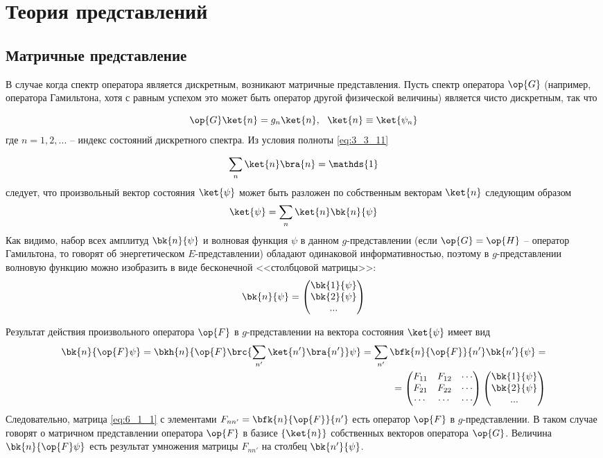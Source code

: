 \chapter{Теория представлений}

\section{Матричные представление}

В случае когда спектр оператора является дискретным, возникают матричные представления. Пусть спектр оператора $\op{G}$ (например, оператора Гамильтона, хотя с равным успехом это может быть оператор другой физической величины) является чисто дискретным, так что

$$
\op{G} \ket{n} = g_n \ket{n},~~ \ket{n} \equiv \ket{\psi_n}
$$%
%
где $n = 1, 2,...$ -- индекс состояний дискретного спектра. Из условия полноты \eqref{eq:3_3_11}

$$
\sum_n \ket{n}\bra{n} = \mathds{1}
$$%
%
следует, что произвольный вектор состояния $\ket{\psi}$ может быть разложен по собственным векторам $\ket{n}$ следующим образом
$$
\ket{\psi}=\sum_n \ket{n}\bk{n}{\psi}
$$%
%
Как видимо, набор всех амплитуд $\bk{n}{\psi}$ и волновая функция $\psi$ в данном $g$-представлении (если $\op{G}=\op{H}$ -- оператор Гамильтона, то говорят об энергетическом $E$-представлении) обладают одинаковой информативностью, поэтому в $g$-представлении волновую функцию можно изобразить в виде бесконечной <<столбцовой матрицы>>:
$$
\bk{n}{\psi} = \begin{pmatrix}
\bk{1}{\psi}\\
\bk{2}{\psi}\\
...
\end{pmatrix}
$$

Результат действия произвольного оператора $\op{F}$ в $g$-представлении на вектора состояния $\ket{\psi}$ имеет вид
\begin{equation}
\begin{split}
\label{eq:6_1_1}
\bk{n}{\op{F}\psi} = \bkh{n}{\op{F}\brc{\sum_{n'} \ket{n'}\bra{n'}} \psi} = \sum_{n'} \bfk{n}{\op{F}}{n'}\bk{n'}{\psi} = \\ = \begin{pmatrix}
F_{11} & F_{12} & \cdots\\
F_{21} & F_{22} & \cdots\\
\cdots & \cdots & \cdots
\end{pmatrix} \begin{pmatrix}
\bk{1}{\psi}\\
\bk{2}{\psi}\\
...
\end{pmatrix}
\end{split}
\end{equation}%
%
Следовательно, матрица \eqref{eq:6_1_1} с элементами $F_{nn'} = \bfk{n}{\op{F}}{n'}$ есть оператор $\op{F}$ в $g$-представлении. В таком случае говорят о матричном представлении оператора $\op{F}$ в базисе $\{\ket{n}\}$ собственных векторов оператора $\op{G}$. Величина $\bk{n}{\op{F}\psi}$ есть результат умножения матрицы $F_{nn'}$ на столбец $\bk{n'}{\psi}$.


